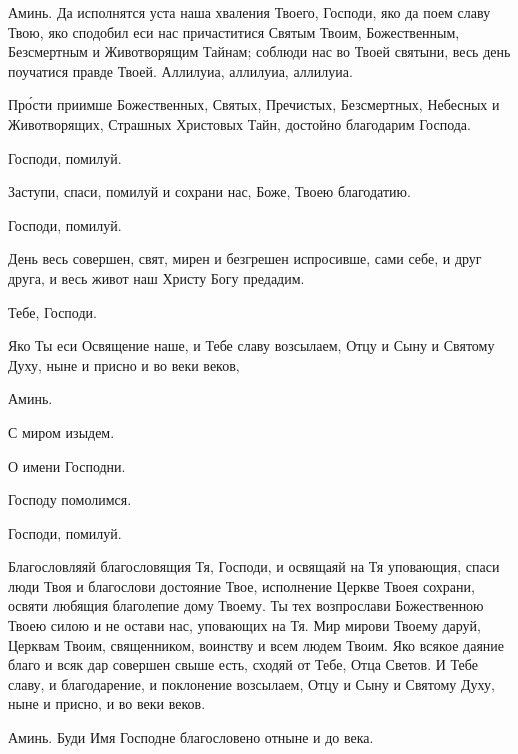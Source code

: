 \begin{mymulticols}
 Аминь. Да исполнятся уста наша хваления Твоего, Господи, яко да поем славу Твою, яко сподобил еси нас причаститися Святым Твоим, Божественным, Безсмертным и Животворящим Тайнам; соблюди нас во Твоей святыни, весь день поучатися правде Твоей. Аллилуиа, аллилуиа, аллилуиа. 



 Пр\'{о}сти приимше Божественных, Святых, Пречистых, Безсмертных, Небесных и Животворящих, Страшных Христовых Тайн, достойно благодарим Господа. 

 Господи, помилуй. 

 Заступи, спаси, помилуй и сохрани нас, Боже, Твоею благодатию. 

 Господи, помилуй. 

 День весь совершен, свят, мирен и безгрешен испросивше, сами себе, и друг друга, и весь живот наш Христу Богу предадим. 

 Тебе, Господи. 

 Яко Ты еси Освящение наше, и Тебе славу возсылаем, Отцу и Сыну и Святому Духу, ныне и присно и во веки веков,

 Аминь.

 С миром изыдем.

 О имени Господни. 

 Господу помолимся.

 Господи, помилуй. 


 Благословляяй благословящия Тя, Господи, и освящаяй на Тя уповающия, спаси люди Твоя и благослови достояние Твое, исполнение Церкве Твоея сохрани, освяти любящия благолепие дому Твоему. Ты тех возпрослави Божественною Твоею силою и не остави нас, уповающих на Тя. Мир мирови Твоему даруй, Церквам Твоим, священником, воинству и всем людем Твоим. Яко всякое даяние благо и всяк дар совершен свыше есть, сходяй от Тебе, Отца Светов. И Тебе славу, и благодарение, и поклонение возсылаем, Отцу и Сыну и Святому Духу, ныне и присно, и во веки веков. 

 Аминь. Буди Имя Господне благословено отныне и до века. 


\end{mymulticols}
